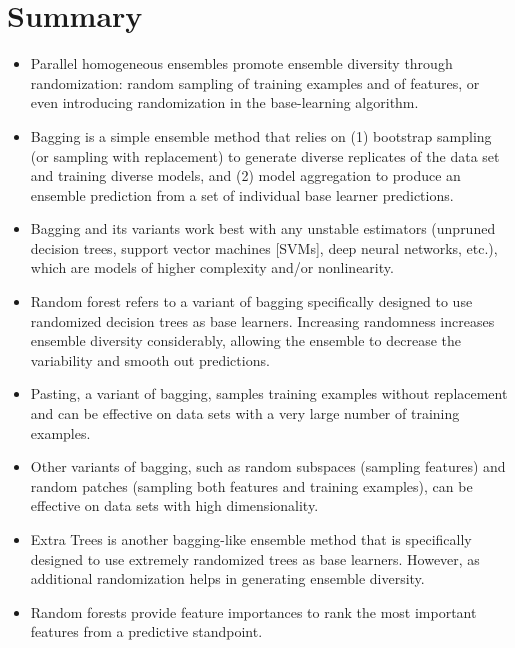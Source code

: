 \section{Summary}
\begin{itemize}

    \item Parallel homogeneous ensembles promote ensemble diversity through randomization: random sampling of training examples and of features, or even introducing randomization in the base-learning algorithm.
    \item Bagging is a simple ensemble method that relies on (1) bootstrap sampling (or
          sampling with replacement) to generate diverse replicates of the data set and
          training diverse models, and (2) model aggregation to produce an ensemble
          prediction from a set of individual base learner predictions.
    \item Bagging and its variants work best with any unstable estimators (unpruned decision trees, support vector machines [SVMs], deep neural networks, etc.), which
          are models of higher complexity and/or nonlinearity.
    \item Random forest refers to a variant of bagging specifically designed to use randomized decision trees as base learners. Increasing randomness increases
          ensemble diversity considerably, allowing the ensemble to decrease the variability and smooth out predictions.
    \item Pasting, a variant of bagging, samples training examples without replacement
          and can be effective on data sets with a very large number of training examples.
    \item Other variants of bagging, such as random subspaces (sampling features) and
          random patches (sampling both features and training examples), can be effective on data sets with high dimensionality.
    \item Extra Trees is another bagging-like ensemble method that is specifically
          designed to use extremely randomized trees as base learners. However,  as additional randomization helps in generating ensemble diversity.
    \item Random forests provide feature importances to rank the most important features from a predictive standpoint.
\end{itemize}